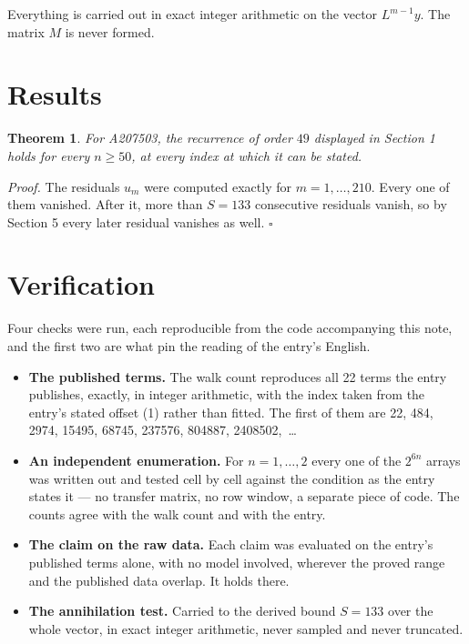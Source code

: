 \documentclass[11pt]{article}
\newtheorem{theorem}{Theorem}
\theoremstyle{definition}
\begin{document}
Everything is carried out in exact integer arithmetic on the vector $L^{m-1}y$. The matrix $M$ is never formed.

\section{Results}

\begin{theorem} For A207503, the recurrence of order $49$ displayed in Section 1 holds for every $n \ge 50$, at every index at which it can be stated.\end{theorem}

{\itshape Proof.} The residuals $u_m$ were computed exactly for $m = 1,\dots,210$. Every one of them vanished. After it, more than $S = 133$ consecutive residuals vanish, so by Section 5 every later residual vanishes as well. $\square$

\section{Verification}

Four checks were run, each reproducible from the code accompanying this note, and the first two are what pin the reading of the entry's English.

\begin{itemize}

\item {\bfseries The published terms.} The walk count reproduces all 22 terms the entry publishes, exactly, in integer arithmetic, with the index taken from the entry's stated offset (1) rather than fitted. The first of them are 22, 484, 2974, 15495, 68745, 237576, 804887, 2408502,~\dots

\item {\bfseries An independent enumeration.} For $n = 1,\dots,2$ every one of the $2^{6n}$ arrays was written out and tested cell by cell against the condition as the entry states it --- no transfer matrix, no row window, a separate piece of code. The counts agree with the walk count and with the entry.

\item {\bfseries The claim on the raw data.} Each claim was evaluated on the entry's published terms alone, with no model involved, wherever the proved range and the published data overlap. It holds there.

\item {\bfseries The annihilation test.} Carried to the derived bound $S = 133$ over the whole vector, in exact integer arithmetic, never sampled and never truncated.

\end{itemize}
\end{document}
